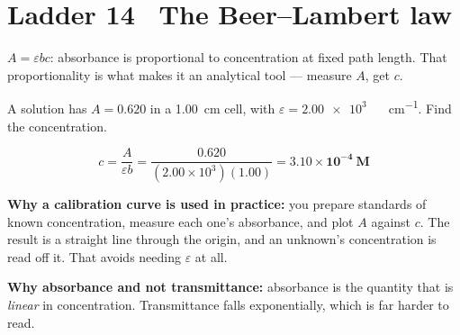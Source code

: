 \documentclass{apchem-worksheet}
\begin{document}
\section*{\sffamily Ladder 14 \textbullet\ The Beer--Lambert law}

$A = \varepsilon b c$: absorbance is proportional to concentration at
fixed path length. That proportionality is what makes it an analytical
tool --- measure $A$, get $c$.

\begin{workedexample}
A solution has $A = \num{0.620}$ in a \SI{1.00}{\centi\metre} cell, with
$\varepsilon = \SI{2.00e3}{}$~\si{\per\Molar\per\centi\metre}. Find the
concentration.

\[ c = \frac{A}{\varepsilon b} = \frac{0.620}{(2.00\times10^{3})(1.00)}
   = \mathbf{3.10\times10^{-4}~M} \]

\textbf{Why a calibration curve is used in practice:} you prepare
standards of known concentration, measure each one's absorbance, and plot
$A$ against $c$. The result is a straight line through the origin, and an
unknown's concentration is read off it. That avoids needing
$\varepsilon$ at all.

\textbf{Why absorbance and not transmittance:} absorbance is the quantity
that is \emph{linear} in concentration. Transmittance falls
exponentially, which is far harder to read.
\end{workedexample}
\end{document}
